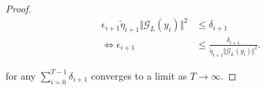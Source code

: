 \documentclass[12pt]{article}
\begin{document}
\begin{proof}
            \begin{align*}
                \epsilon_{i + 1}\tilde \eta_{i + 1}
                \Vert \mathcal G_L(y_i)\Vert^2 
                &\le \delta_{i + 1}
                \\
                \iff 
                \epsilon_{i + 1}
                &\le 
                \frac{\delta_{i + 1} }{\tilde\eta_{t + 1}\Vert \mathcal G_L(y_i)\Vert^2}. 
            \end{align*}

            for any $\sum_{i = 0}^{T - 1}\delta_{i + 1}$ converges to a limit as $T \rightarrow \infty$. 

        \end{proof}

\end{document}
